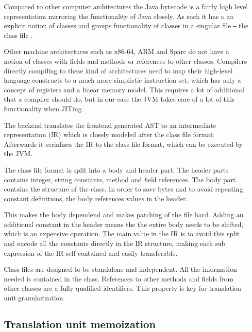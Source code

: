 \documentclass{VUMIFPSbakalaurinis}
\begin{document}
Compared to other computer architectures the Java bytecode is a fairly high level representation mirroring the functionality of Java closely.
As such it has a an explicit notion of classes and groups functionality of classes in a singular file ‒ the class file \cite{ClassFileFormat}.

Other machine architectures such as x86-64, ARM and Sparc do not have a notion of classes with fields and methods or references to other classes.
Compilers directly compiling to these kind of architectures need to map their high-level language constructs to a much more simplistic instruction set, which has only a concept of registers and a linear memory model.
This requires a lot of additional that a compiler should do, but in our case the JVM takes care of a lot of this functionality when JITing.

The backend translates the frontend generated AST to an intermediate representation (IR) which is closely modeled after the class file format.
Afterwards it serializes the IR to the class file format, which can be executed by the JVM.

The class file format is split into a body and header part.
The header parts contains integer, string constants, method and field references.
The body part contains the structure of the class.
In order to save bytes and to avoid repeating constant definitions, the body references values in the header.

This makes the body dependend and makes patching of the file hard.
Adding an additional constant in the header means the the entire body needs to be shifted, which is an expensive operation.
The main value in the IR is to avoid this split and encode all the constants directly in the IR structure, making each sub expression of the IR self contained and easily transferable.

Class files are designed to be standalone and independent.
All the information needed is contained in the class.
References to other methods and fields from other classes are a fully qualified identifiers.
This property is key for translation unit granularization.

\subsection{Translation unit memoization}
\end{document}
